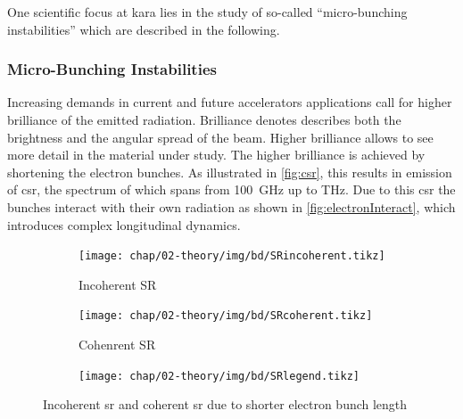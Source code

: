One scientific focus at \gls{kara} lies in the study of so-called ``micro-bunching instabilities'' which are described in the following.

\subsubsection*{Micro-Bunching Instabilities}
Increasing demands in current and future accelerators applications call for higher brilliance of the emitted radiation. 
Brilliance denotes describes both the brightness and the angular spread of the beam. 
Higher brilliance allows to see more detail in the material under study.
The higher brilliance is achieved by shortening the electron bunches. 
As illustrated in \autoref{fig:csr}, this results in emission of \gls{csr}, the spectrum of which spans from \SI{100}{\GHz} up to THz.
Due to this \gls{csr} the bunches interact with their own radiation as shown in \autoref{fig:electronInteract}, which introduces complex longitudinal dynamics.
\begin{figure}[tb]
	\centering
	\begin{subfigure}{0.4\textwidth}
		\centering
		\texttt{[image: chap/02-theory/img/bd/SRincoherent.tikz]}  
		\caption{Incoherent SR}
		\label{fig:srincoherent}
	\end{subfigure}
	\hfill
	\begin{subfigure}{0.4\textwidth}
		\centering
		\texttt{[image: chap/02-theory/img/bd/SRcoherent.tikz]}  
		\caption{Cohenrent SR}
		\label{fig:srcoherent}
	\end{subfigure}
	\begin{center}
		\begin{subfigure}{0.4\textwidth}
			\centering
			\texttt{[image: chap/02-theory/img/bd/SRlegend.tikz]}  
			\label{fig:srlegend}
		\end{subfigure}
	\end{center}
	\caption[Incoherent and coherent SR]{Incoherent \gls{sr} and coherent \gls{sr} due to shorter electron bunch length \cite{rota2018}}
	\label{fig:csr}
\end{figure}


